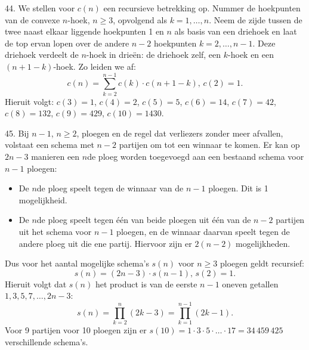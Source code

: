 \begin{problem}{44.}
	We stellen voor $c(n)$ een recursieve betrekking op. Nummer de hoekpunten van de convexe $n$-hoek, $n \geq 3$, opvolgend als $k = 1,\dotsc,n$. Neem de zijde tussen de twee naast elkaar liggende hoekpunten 1 en $n$ als basis van een driehoek en laat de top ervan lopen over de andere $n - 2$ hoekpunten $k = 2,\dotsc,n-1$. Deze driehoek verdeelt de $n$-hoek in drieën: de driehoek zelf, een $k$-hoek en een $(n + 1 - k)$-hoek. Zo leiden we af:
    \begin{equation*}
        c(n) = \textstyle\sum\limits_{k=2}^{n-1} c(k) \cdot c(n + 1 - k),\, c(2) = 1.
    \end{equation*}
    Hieruit volgt: $c(3) = 1$, $c(4) = 2$, $c(5) = 5$, $c(6) = 14$, $c(7) = 42$, $c(8) = 132$, $c(9) = 429$, $c(10) = 1430$.
\end{problem}

\clearpage

\begin{problem}{45.}
    Bij $n - 1$, $n \geq 2$, ploegen en de regel dat verliezers zonder meer afvallen, volstaat een schema met $n - 2$ partijen om tot een winnaar te komen. Er kan op $2n - 3$ manieren een $n$de ploeg worden toegevoegd aan een bestaand schema voor $n - 1$ ploegen:
    \begin{itemize}
        \item De $n$de ploeg speelt tegen de winnaar van de $n - 1$ ploegen. Dit is 1 mogelijkheid.
        \item De $n$de ploeg speelt tegen één van beide ploegen uit één van de $n - 2$ partijen uit het schema voor $n - 1$ ploegen, en de winnaar daarvan speelt tegen de andere ploeg uit die ene partij. Hiervoor zijn er $2 (n - 2)$ mogelijkheden.
    \end{itemize}
    Dus voor het aantal mogelijke schema's $s(n)$ voor $n \geq 3$ ploegen geldt recursief:
    \begin{equation*}
        s(n) = (2n - 3) \cdot s(n - 1),\, s(2) = 1.
    \end{equation*}
    Hieruit volgt dat $s(n)$ het product is van de eerste $n - 1$ oneven getallen $1,3,5,7,\dotsc,2n-3$:
    \begin{equation*}
        s(n) = \textstyle\prod\limits_{k = 2}^{n} (2k - 3) = \textstyle\prod\limits_{k = 1}^{n-1} (2k - 1).
    \end{equation*}
    Voor 9 partijen voor 10 ploegen zijn er $s(10) = 1 \cdot 3 \cdot 5 \cdot \dots \cdot 17 = 34\,459\,425$ verschillende schema's.
\end{problem}

